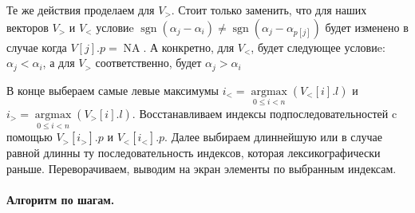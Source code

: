 \documentclass[12pt]{article}
\newcommand{\sgn}{\operatorname{sgn}}
\newcommand{\argmax}{\operatorname{argmax}}
\newcommand{\NA}{\operatorname{NA}}
\begin{document}
Те же действия проделаем для $ V_> $. Стоит только заменить, что для наших векторов $ V_> $ и $ V_< $
условиe $ \sgn(\alpha_j - \alpha_i) \ne \sgn(\alpha_j - \alpha_{p[j]}) $ будет изменено в случае когда 
$ V[j].p = \NA $. А конкретно, для $ V_< $, будет следующее условиe:
$ \alpha_j < \alpha_i $, а для $ V_> $ соответственно, будет $ \alpha_j > \alpha_i$

В конце выбераем самые левые максимумы $ i_< = \argmax\limits_{0 \le i < n}(V_<[i].l) $ 
и $ i_> = \argmax\limits_{0 \le i < n}(V_>[i].l) $. Восстанавливаем индексы подпоследовательностей c
помощью $ V_>[i_>].p $ и $ V_<[i_<].p $. Далее выбираем длиннейшую или в случае равной длинны
ту последовательность индексов, которая лексикографически раньше. 
Переворачиваем, выводим на экран элементы по выбранным индексам.


\paragraph{Алгоритм по шагам.}
\end{document}
